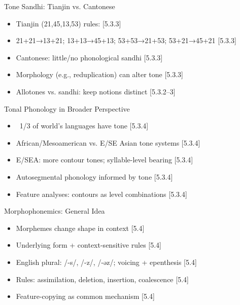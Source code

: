 \documentclass{beamer}
\newcommand{\booksrc}[1]{\hfill {\tiny [#1]}}
\begin{document}
\begin{frame}{Tone Sandhi: Tianjin vs. Cantonese}
\begin{itemize}
\item Tianjin (21,45,13,53) rules: \booksrc{5.3.3}
\item 21+21→13+21; 13+13→45+13; 53+53→21+53; 53+21→45+21 \booksrc{5.3.3}
\item Cantonese: little/no phonological sandhi \booksrc{5.3.3}
\item Morphology (e.g., reduplication) can alter tone \booksrc{5.3.3}
\item Allotones vs. sandhi: keep notions distinct \booksrc{5.3.2–3}
\end{itemize}
\end{frame}

\begin{frame}{Tonal Phonology in Broader Perspective}
\begin{itemize}
\item ~1/3 of world’s languages have tone \booksrc{5.3.4}
\item African/Mesoamerican vs. E/SE Asian tone systems \booksrc{5.3.4}
\item E/SEA: more contour tones; syllable-level bearing \booksrc{5.3.4}
\item Autosegmental phonology informed by tone \booksrc{5.3.4}
\item Feature analyses: contours as level combinations \booksrc{5.3.4}
\end{itemize}
\end{frame}


\begin{frame}{Morphophonemics: General Idea}
\begin{itemize}
\item Morphemes change shape in context \booksrc{5.4}
\item Underlying form + context-sensitive rules \booksrc{5.4}
\item English plural: /-s/, /-z/, /-əz/; voicing + epenthesis \booksrc{5.4}
\item Rules: assimilation, deletion, insertion, coalescence \booksrc{5.4}
\item Feature-copying as common mechanism \booksrc{5.4}
\end{itemize}
\end{frame}
\end{document}
